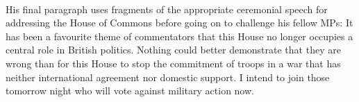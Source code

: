 \documentclass{article}
\begin{document}
\begin{onehalfspace}
\paragraph{}His final paragraph uses fragments of the appropriate ceremonial speech for addressing the House of Commons before going on to challenge his fellow MPs: It has been a favourite theme of commentators that this House no longer occupies a central role in British politics. Nothing could better demonstrate that they are wrong than for this House to stop the commitment of troops in a war that has neither international agreement nor domestic support. I intend to join those tomorrow night who will vote against military action now.

\cite{Cook:2003nr}

\end{onehalfspace}
\medskip

\end{document}
